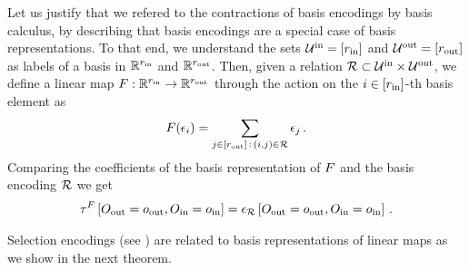 \begin{example}
    Let us justify that we refered to the contractions of basis encodings by basis calculus, by describing that basis encodings are a special case of basis representations.
    To that end, we understand the sets $\mathcal{U}^{\mathrm{in}}=[r_{\mathrm{in}}]$ and $\mathcal{U}^{\mathrm{out}}=[r_{\mathrm{out}}]$ as labels of a basis in $\mathbb{R}^{r_{\mathrm{in}}}$ and $\mathbb{R}^{r_{\mathrm{out}}}$.
    Then, given a relation $\mathcal{R} \subset \mathcal{U}^{\mathrm{in}} \times \mathcal{U}^{\mathrm{out}}$, we define a linear map $F : \mathbb{R}^{r_{\mathrm{in}}} \rightarrow \mathbb{R}^{r_{\mathrm{out}}}$ through the action on the $i\in[r_{\mathrm{in}}]$-th basis element as
    \begin{align*}
        F(\epsilon_{i}) = \sum_{j\in[r_{\mathrm{out}}]\, : \, (i,j) \in \mathcal{R}} \epsilon_{j} \, .
    \end{align*}
    Comparing the coefficients of the basis representation of $F$ and the basis encoding $\mathcal{R}$ we get
    \begin{align*}
        \tau^{F}\left[O_{\mathrm{out}}=o_{\mathrm{out}},O_{\mathrm{in}}=o_{\mathrm{in}}\right]
        = \epsilon_{\mathcal{R}}\left[O_{\mathrm{out}}=o_{\mathrm{out}},O_{\mathrm{in}}=o_{\mathrm{in}}\right] \, .
    \end{align*}
\end{example}




Selection encodings (see ) are related to basis representations of linear maps as we show in the next theorem.

